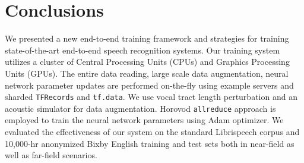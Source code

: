 \documentclass[a4paper]{article}
\begin{document}
%
%
\section{Conclusions}
\label{sec:conclusions}
We presented a new end-to-end training framework and
 strategies for training 
state-of-the-art end-to-end speech recognition systems.
Our training system utilizes a cluster of Central Processing Units 
  (CPUs) and Graphics Processing Units (GPUs).
The entire data reading, large scale data augmentation,
neural network parameter updates are performed on-the-fly
using example servers and sharded {\tt TFRecords} and {\tt tf.data}. 
  We use vocal tract length perturbation and an acoustic simulator 
for data augmentation. Horovod {\tt allreduce} approach is employed 
to train the neural network parameters using Adam optimizer.
We evaluated the effectiveness of our system on the standard 
Librispeech corpus \cite{v_panayotov_icassp_2015_00} and 
  10,000-hr anonymized Bixby English training 
 and test sets both in near-field as well as
far-field scenarios.  
\eightpt


\end{document}
